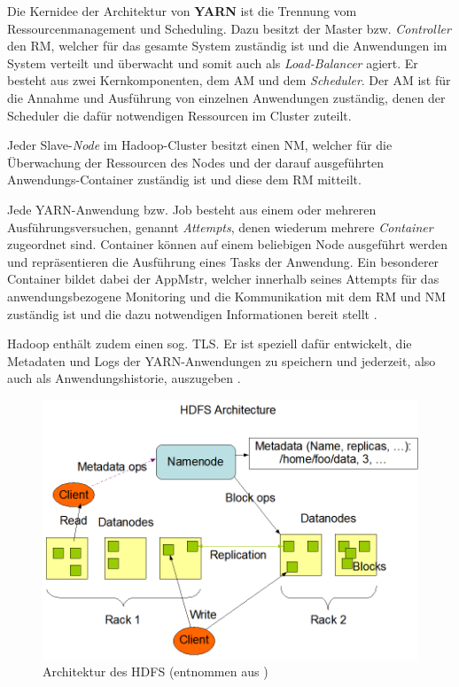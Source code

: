 Die Kernidee der Architektur von \textbf{YARN} ist die Trennung vom Ressourcenmanagement und Scheduling. Dazu besitzt der Master bzw. \emph{Controller} den \ac{RM}, welcher für das gesamte System zuständig ist und die Anwendungen im System verteilt und überwacht und somit auch als \emph{Load-Balancer} agiert. Er besteht aus zwei Kernkomponenten, dem \ac{AM} und dem \emph{Scheduler}. Der \ac{AM} ist für die Annahme und Ausführung von einzelnen Anwendungen zuständig, denen der Scheduler die dafür notwendigen Ressourcen im Cluster zuteilt.

Jeder Slave-\emph{Node} im Hadoop-Cluster besitzt einen \ac{NM}, welcher für die Überwachung der Ressourcen des Nodes und der darauf ausgeführten Anwendungs-Container zuständig ist und diese dem \ac{RM} mitteilt.

Jede YARN-Anwendung bzw. Job besteht aus einem oder mehreren Ausführungsversuchen, genannt \emph{Attempts}, denen wiederum mehrere \emph{Container} zugeordnet sind. Container können auf einem beliebigen Node ausgeführt werden und repräsentieren die Ausführung eines Tasks der Anwendung. Ein besonderer Container bildet dabei der \ac{AppMstr}, welcher innerhalb seines Attempts für das anwendungsbezogene Monitoring und die Kommunikation mit dem \ac{RM} und \ac{NM} zuständig ist und die dazu notwendigen Informationen bereit stellt \cite{HadoopYarnArch271}.

Hadoop enthält zudem einen sog. \ac{TLS}. Er ist speziell dafür entwickelt, die Metadaten und Logs der YARN-Anwendungen zu speichern und jederzeit, also auch als Anwendungshistorie, auszugeben \cite{HadoopYarnTlServer271}.

\begin{figure}
    \centering
    \includegraphics[width=.8\columnwidth]{./images/hdfsarchitecture.png}
    \caption[Architektur des HDFS]{Architektur des HDFS (entnommen aus \cite{HadoopHdfsDesc271})}
    \label{fig:hdfsarch}
\end{figure}

